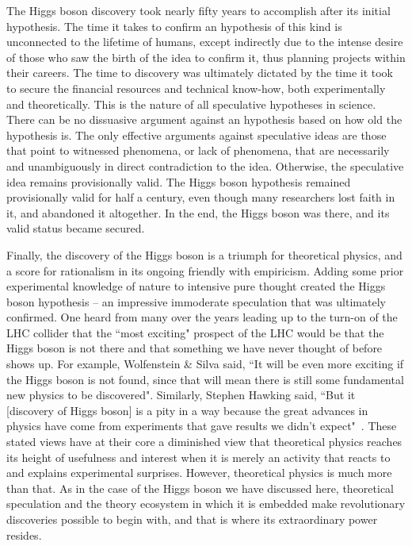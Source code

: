 \documentclass[letter,12pt]{article}
\begin{document}
The Higgs boson discovery took nearly fifty years to accomplish after its initial hypothesis. The time it takes to confirm an hypothesis of this kind is unconnected to the lifetime of humans, except indirectly due to the intense desire of those who saw the birth of the idea to confirm it, thus planning projects within their careers.  The time to discovery was ultimately dictated by the time it took to secure the financial resources and technical know-how, both experimentally and theoretically. This is the nature of all speculative hypotheses in science. There can be no dissuasive argument against an hypothesis based on how old the hypothesis is. The only effective arguments against speculative ideas are those that point to witnessed phenomena, or lack of phenomena, that are necessarily and unambiguously in direct contradiction to the idea. Otherwise, the speculative idea remains provisionally valid. The Higgs boson hypothesis remained provisionally valid for half a century, even though many researchers lost faith in it, and abandoned it altogether. In the end, the Higgs boson was there, and its valid status became secured.

Finally, the discovery of the Higgs boson is a triumph for theoretical physics, and a score for rationalism in its ongoing friendly with empiricism. Adding some prior experimental knowledge of nature to intensive pure thought created the Higgs boson hypothesis -- an impressive immoderate speculation that was ultimately confirmed. One heard from many over the years leading up to the turn-on of the LHC collider that the ``most exciting" prospect of the LHC would be that the Higgs boson is not there and that something we have never thought of before shows up.  For example, Wolfenstein \& Silva said, ``It will be even more exciting if the Higgs boson is not found, since that will mean there is still some fundamental new physics to be discovered"\cite{Wolfenstein:2010}. Similarly, Stephen Hawking said, ``But it [discovery of Higgs boson] is a pity in a way because the great advances in physics have come from experiments that gave results we didn't expect"~\cite{BBC:2012}.
These stated views have at their core a diminished view that theoretical physics reaches its height of usefulness and interest when it is merely an activity that reacts to and explains experimental surprises. However, theoretical physics is much more than that. As in the case of the Higgs boson we have discussed here, theoretical speculation and the theory ecosystem in which it is embedded make revolutionary discoveries possible to begin with, and that is where its extraordinary power resides.   
\end{document}
